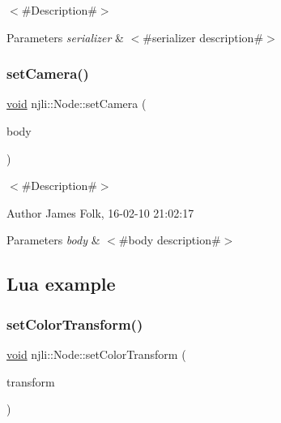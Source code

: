 $<$\#\+Description\#$>$


\begin{DoxyParams}{Parameters}
{\em serializer} & $<$\#serializer description\#$>$ \\
\hline
\end{DoxyParams}
\mbox{\label{classnjli_1_1_node_a24cd0259329061a4bfcabd5d1dff6071}} 
\subsubsection{\texorpdfstring{set\+Camera()}{setCamera()}}
{\footnotesize\ttfamily \mbox{\hyperlink{_thread_8h_af1e856da2e658414cb2456cb6f7ebc66}{void}} njli\+::\+Node\+::set\+Camera (\begin{DoxyParamCaption}\item[{\mbox{\hyperlink{classnjli_1_1_camera}{Camera}} $\ast$}]{body }\end{DoxyParamCaption})}



$<$\#\+Description\#$>$ 

\begin{DoxyAuthor}{Author}
James Folk, 16-\/02-\/10 21\+:02\+:17
\end{DoxyAuthor}

\begin{DoxyParams}{Parameters}
{\em body} & $<$\#body description\#$>$\\
\hline
\end{DoxyParams}
\hypertarget{classnjli_1_1_steering_behavior_wander_ex1}{}\subsection{Lua example}\label{classnjli_1_1_steering_behavior_wander_ex1}

\begin{DoxyCodeInclude}
\end{DoxyCodeInclude}
\mbox{\label{classnjli_1_1_node_af52fa39a8c2869ddcd48b452d423fc26}} 
\subsubsection{\texorpdfstring{set\+Color\+Transform()}{setColorTransform()}}
{\footnotesize\ttfamily \mbox{\hyperlink{_thread_8h_af1e856da2e658414cb2456cb6f7ebc66}{void}} njli\+::\+Node\+::set\+Color\+Transform (\begin{DoxyParamCaption}\item[{const bt\+Transform \&}]{transform }\end{DoxyParamCaption})}

